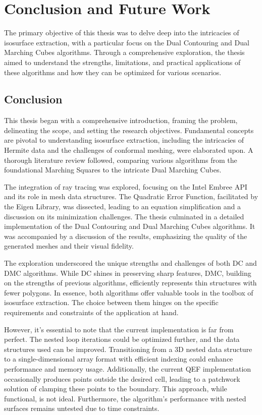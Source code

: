 \chapter{Conclusion and Future Work} \label{Chapter7}

The primary objective of this thesis was to delve deep into the intricacies of isosurface extraction, with a particular focus on the Dual Contouring and Dual Marching Cubes algorithms. Through a comprehensive exploration, the thesis aimed to understand the strengths, limitations, and practical applications of these algorithms and how they can be optimized for various scenarios.

\section{Conclusion}

This thesis began with a comprehensive introduction, framing the problem, delineating the scope, and setting the research objectives. Fundamental concepts are pivotal to understanding isosurface extraction, including the intricacies of Hermite data and the challenges of conformal meshing, were elaborated upon. A thorough literature review followed, comparing various algorithms from the foundational Marching Squares to the intricate Dual Marching Cubes.

The integration of ray tracing was explored, focusing on the Intel Embree API and its role in mesh data structures. The Quadratic Error Function, facilitated by the Eigen Library, was dissected, leading to an equation simplification and a discussion on its minimization challenges. The thesis culminated in a detailed implementation of the Dual Contouring and Dual Marching Cubes algorithms. It was accompanied by a discussion of the results, emphasizing the quality of the generated meshes and their visual fidelity.

The exploration underscored the unique strengths and challenges of both DC and DMC algorithms. While DC shines in preserving sharp features, DMC, building on the strengths of previous algorithms, efficiently represents thin structures with fewer polygons. In essence, both algorithms offer valuable tools in the toolbox of isosurface extraction. The choice between them hinges on the specific requirements and constraints of the application at hand.

However, it's essential to note that the current implementation is far from perfect. The nested loop iterations could be optimized further, and the data structures used can be improved. Transitioning from a 3D nested data structure to a single-dimensional array format with efficient indexing could enhance performance and memory usage. Additionally, the current QEF implementation occasionally produces points outside the desired cell, leading to a patchwork solution of clamping these points to the boundary. This approach, while functional, is not ideal. Furthermore, the algorithm's performance with nested surfaces remains untested due to time constraints.


